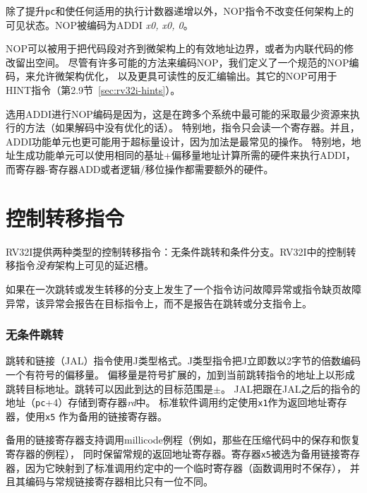 除了提升{\tt pc}和使任何适用的执行计数器递增以外，NOP指令不改变任何架构上的可见状态。NOP被编码为ADDI {\em x0, x0, 0}。

\begin{commentary}
NOP可以被用于把代码段对齐到微架构上的有效地址边界，或者为内联代码的修改留出空间。
尽管有许多可能的方法来编码NOP，我们定义了一个规范的NOP编码，来允许微架构优化，
以及更具可读性的反汇编输出。其它的NOP可用于HINT指令（第2.9节~\ref{sec:rv32i-hints}）。

选用ADDI进行NOP编码是因为，这是在跨多个系统中最可能的采取最少资源来执行的方法（如果解码中没有优化的话）。
特别地，指令只会读一个寄存器。并且，ADDI功能单元也更可能用于超标量设计，因为加法是最常见的操作。
特别地，地址生成功能单元可以使用相同的基址+偏移量地址计算所需的硬件来执行ADDI，
而寄存器-寄存器ADD或者逻辑/移位操作都需要额外的硬件。
\end{commentary}

\section{控制转移指令}

RV32I提供两种类型的控制转移指令：无条件跳转和条件分支。RV32I中的控制转移指令{\em 没有}架构上可见的延迟槽。

如果在一次跳转或发生转移的分支上发生了一个指令访问故障异常或指令缺页故障异常，该异常会报告在目标指令上，而不是报告在跳转或分支指令上。

\subsubsection*{无条件跳转}

\vspace{-0.1in} 跳转和链接（JAL）指令使用J类型格式。J类型指令把J立即数以2字节的倍数编码一个有符号的偏移量。
偏移量是符号扩展的，加到当前跳转指令的地址上以形成跳转目标地址。跳转可以因此到达的目标范围是$\pm$。
JAL把跟在JAL之后的指令的地址（{\tt pc}+4）存储到寄存器{\em rd}中。
标准软件调用约定使用{\tt x1}作为返回地址寄存器，使用{\tt x5} 作为备用的链接寄存器。

\begin{commentary}
备用的链接寄存器支持调用millicode例程（例如，那些在压缩代码中的保存和恢复寄存器的例程），
同时保留常规的返回地址寄存器。寄存器{\tt x5}被选为备用链接寄存器，因为它映射到了标准调用约定中的一个临时寄存器（函数调用时不保存），
并且其编码与常规链接寄存器相比只有一位不同。
\end{commentary}

